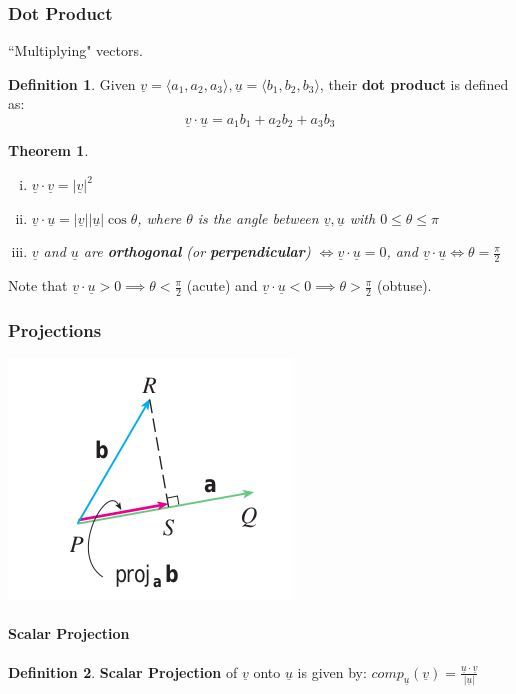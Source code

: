 \documentclass[12 pt]{article}
\newtheorem{thm}{Theorem}
\theoremstyle{definition}
\newtheorem{defn}{Definition}
\begin{document}
	\subsubsection{Dot Product} ``Multiplying" vectors.  
	\begin{defn}
		Given $\underline{v}=\langle a_1, a_2, a_3 \rangle, \underline{u}=\langle b_1,b_2,b_3 \rangle$, their \textbf{dot product} is defined as: $$\underline{v} \cdot \underline{u}=a_1b_1+a_2b_2+a_3b_3$$
	\end{defn}
	\begin{thm}
		\begin{enumerate}[i)]
			\item $\underline{v}\cdot \underline{v}=|\underline{v}|^2$
			\item $\underline{v} \cdot \underline{u}=|\underline{v}||\underline{u}|\cos{\theta}$, where $\theta$ is the angle between $\underline{v},\underline{u}$ with $0\leq \theta \leq \pi$ 
			\item $\underline{v}$ and $\underline{u}$ are \textbf{orthogonal} (or \textbf{perpendicular}) $ \iff \underline{v} \cdot \underline{u}=0$, and $\underline{v}\cdot \underline{u} \iff \theta=\frac{\pi}{2}$
		\end{enumerate}
	\end{thm}
Note that $\underline{v}\cdot \underline{u}>0 \implies \theta<\frac{\pi}{2}$ (acute) and $\underline{v} \cdot \underline{u}<0 \implies \theta>\frac{\pi}{2}$ (obtuse).
\subsubsection{Projections} %
	\includegraphics[scale=0.5]{proj}
\paragraph{Scalar Projection} \begin{defn}
	\textbf{Scalar Projection} of $\underline{v}$ onto $\underline{u}$ is given by: $comp_{\underline{u}}(\underline{v})=\frac{\underline{u}\cdot \underline{v}}{|\underline{u}|}$
\end{defn}
\end{document}

